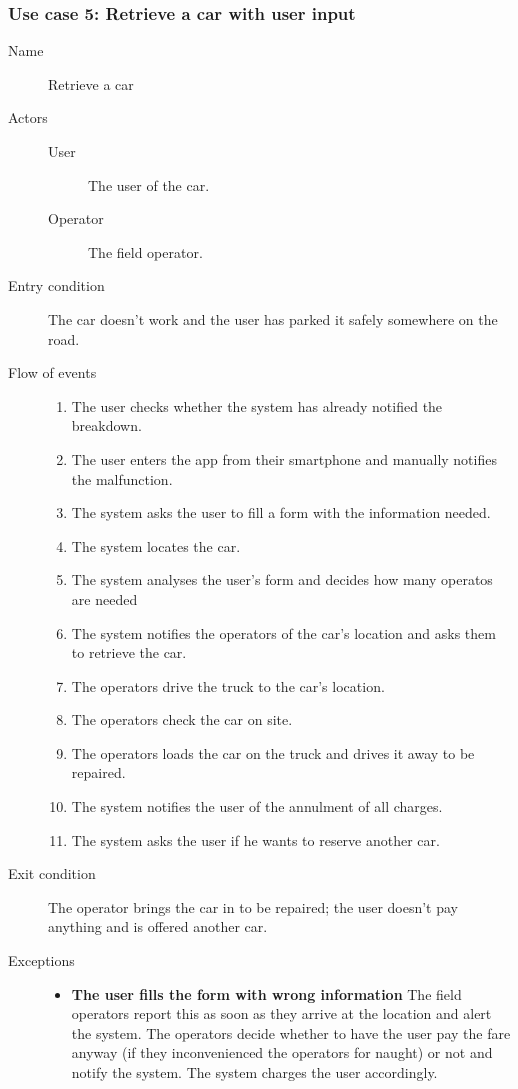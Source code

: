 	\subsubsection{Use case 5: Retrieve a car with user input}
		\begin{description}
			\item[Name] Retrieve a car
			\item[Actors] \hfill
			\begin{description}
				\item[User] The user of the car.
				\item[Operator] The field operator.
			\end{description}
			\item[Entry condition] The car doesn't work and the user has parked it safely somewhere on the road.
			\item[Flow of events] \hfill
			\begin{enumerate}
				\item The user checks whether the system has already notified the breakdown.
				\item The user enters the app from their smartphone and manually notifies the malfunction.
				\item The system asks the user to fill a form with the information needed.
				\item The system locates the car.
				\item The system analyses the user's form and decides how many operatos are needed
				\item The system notifies the operators of the car's location and asks them to retrieve the car.
				\item The operators drive the truck to the car's location.
				\item The operators check the car on site.
				\item The operators loads the car on the truck and drives it away to be repaired.
				\item The system notifies the user of the annulment of all charges.
				\item The system asks the user if he wants to reserve another car.
			\end{enumerate}
			\item[Exit condition] The operator brings the car in to be repaired; the user doesn't pay anything and is offered another car.
			\item[Exceptions] \hfill
			\begin{itemize}
				\item \textbf{The user fills the form with wrong information} The field operators report this as soon as they arrive at the location and alert the system. The operators decide whether to have the user pay the fare anyway (if they inconvenienced the operators for naught) or not and notify the system. The system charges the user accordingly.

\end{itemize}
\end{description}
